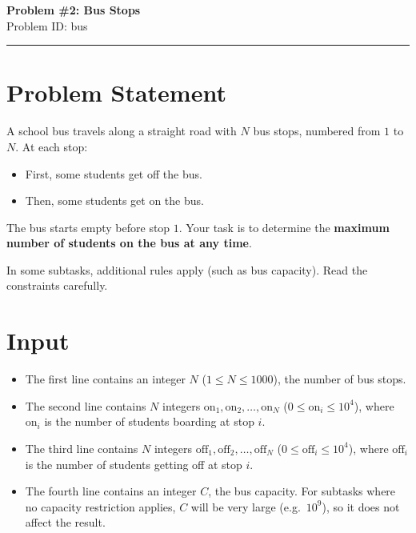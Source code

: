 \documentclass[12pt,a4paper]{article}
\begin{document}
\ifdefined\BOOKLET
  \pagestyle{empty}
\fi

\begin{center}
    {\LARGE \textbf{Problem \#2: Bus Stops}} \\[0.5em]
    {Problem ID: bus} \\[1em]
    \rule{\textwidth}{0.4pt}
\end{center}

\vspace{1em}

\section*{Problem Statement}
A school bus travels along a straight road with $N$ bus stops, numbered from $1$ to $N$.  
At each stop:
\begin{itemize}
    \item First, some students get off the bus.  
    \item Then, some students get on the bus.  
\end{itemize}

The bus starts empty before stop $1$. Your task is to determine the \textbf{maximum number of students on the bus at any time}.

In some subtasks, additional rules apply (such as bus capacity). Read the constraints carefully.

\section*{Input}
\begin{itemize}
    \item The first line contains an integer $N$ ($1 \leq N \leq 1000$), the number of bus stops.  
    \item The second line contains $N$ integers $\text{on}_1, \text{on}_2, \ldots, \text{on}_N$ ($0 \leq \text{on}_i \leq 10^4$),  
    where $\text{on}_i$ is the number of students boarding at stop $i$.  
    \item The third line contains $N$ integers $\text{off}_1, \text{off}_2, \ldots, \text{off}_N$ ($0 \leq \text{off}_i \leq 10^4$),  
    where $\text{off}_i$ is the number of students getting off at stop $i$.  
    \item The fourth line contains an integer $C$, the bus capacity.  
    For subtasks where no capacity restriction applies, $C$ will be very large (e.g.\ $10^9$), so it does not affect the result.  
\end{itemize}
\end{document}
